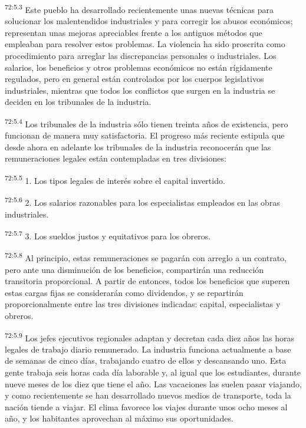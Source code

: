\documentclass[twoside, 11pt]{book}
\begin{document}
\par
\textsuperscript{72:5.3} Este pueblo ha desarrollado recientemente unas nuevas técnicas para solucionar los malentendidos industriales y para corregir los abusos económicos; representan unas mejoras apreciables frente a los antiguos métodos que empleaban para resolver estos problemas. La violencia ha sido proscrita como procedimiento para arreglar las discrepancias personales o industriales. Los salarios, los beneficios y otros problemas económicos no están rígidamente regulados, pero en general están controlados por los cuerpos legislativos industriales, mientras que todos los conflictos que surgen en la industria se deciden en los tribunales de la industria.

\par
\textsuperscript{72:5.4} Los tribunales de la industria sólo tienen treinta años de existencia, pero funcionan de manera muy satisfactoria. El progreso más reciente estipula que desde ahora en adelante los tribunales de la industria reconocerán que las remuneraciones legales están contempladas en tres divisiones:

\par
\textsuperscript{72:5.5} 1. Los tipos legales de interés sobre el capital invertido.

\par
\textsuperscript{72:5.6} 2. Los salarios razonables para los especialistas empleados en las obras industriales.

\par
\textsuperscript{72:5.7} 3. Los sueldos justos y equitativos para los obreros.

\par
\textsuperscript{72:5.8} Al principio, estas remuneraciones se pagarán con arreglo a un contrato, pero ante una disminución de los beneficios, compartirán una reducción transitoria proporcional. A partir de entonces, todos los beneficios que superen estas cargas fijas se considerarán como dividendos, y se repartirán proporcionalmente entre las tres divisiones indicadas: capital, especialistas y obreros.

\par
\textsuperscript{72:5.9} Los jefes ejecutivos regionales adaptan y decretan cada diez años las horas legales de trabajo diario remunerado. La industria funciona actualmente a base de semanas de cinco días, trabajando cuatro de ellos y descansando uno. Esta gente trabaja seis horas cada día laborable y, al igual que los estudiantes, durante nueve meses de los diez que tiene el año. Las vacaciones las suelen pasar viajando, y como recientemente se han desarrollado nuevos medios de transporte, toda la nación tiende a viajar. El clima favorece los viajes durante unos ocho meses al año, y los habitantes aprovechan al máximo sus oportunidades.
\end{document}
